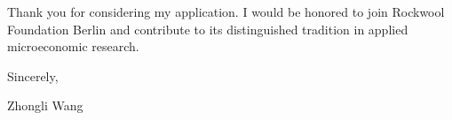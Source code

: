 \documentclass{nfr}
\begin{document}
Thank you for considering my application. 
I would be honored to join Rockwool Foundation Berlin and contribute to its distinguished tradition in applied microeconomic research.\\
\vspace{10mm}

\noindent Sincerely,\\
\vspace{19mm}

\noindent Zhongli Wang

\vspace{10mm}




\end{document}
